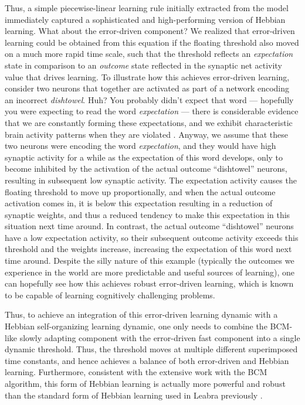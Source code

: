 \documentclass[11pt,twoside]{article}
\begin{document}
Thus, a simple piecewise-linear learning rule initially extracted from the
 model immediately captured a sophisticated
and high-performing version of Hebbian learning. What about the error-driven
component?  We realized that error-driven learning could be obtained from this
equation if the floating threshold also moved on a much more rapid time scale,
such that the threshold reflects an {\em expectation} state in comparison to
an {\em outcome} state reflected in the synaptic net activity value that
drives learning.  To illustrate how this achieves error-driven learning,
consider two neurons that together are activated as part of a network encoding
an incorrect {\em dishtowel}.  Huh?  You probably didn't expect that word ---
hopefully you were expecting to read the word {\em expectation} --- there is
considerable evidence that we are constantly forming these expectations, and
we exhibit characteristic brain activity patterns when they are violated
\cite{P300}.  Anyway, we assume that these two neurons were encoding the word
{\em expectation}, and they would have high synaptic activity for a while as
the expectation of this word develops, only to become inhibited by the
activation of the actual outcome ``dishtowel'' neurons, resulting in
subsequent low synaptic activity.  The expectation activity causes the
floating threshold to move up proportionally, and when the actual outcome
activation comes in, it is below this expectation resulting in a reduction of
synaptic weights, and thus a reduced tendency to make this expectation in this
situation next time around.  In contrast, the actual outcome ``dishtowel''
neurons have a low expectation activity, so their subsequent outcome activity
exceeds this threshold and the weights increase, increasing the expectation of
this word next time around.  Despite the silly nature of this example
(typically the outcomes we experience in the world are more predictable and
useful sources of learning), one can hopefully see how this achieves robust
error-driven learning, which is known to be capable of learning cognitively
challenging problems.

Thus, to achieve an integration of this error-driven learning dynamic with a
Hebbian self-organizing learning dynamic, one only needs to combine the
BCM-like slowly adapting component with the error-driven fast component into a
single dynamic threshold.  Thus, the threshold moves at multiple different
superimposed time constants, and hence achieves a balance of both error-driven
and Hebbian learning.  Furthermore, consistent with the extensive work with
the BCM algorithm, this form of Hebbian learning is actually more powerful and
robust than the standard form of Hebbian learning used in Leabra previously
\cite{bcm cites}.
\end{document}

